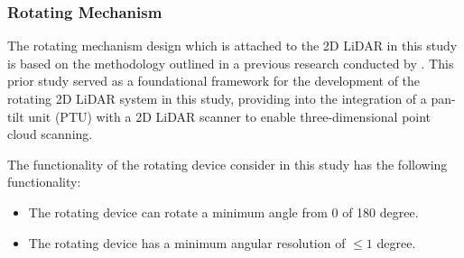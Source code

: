 

\subsubsection{Rotating Mechanism}

The rotating mechanism design which is attached to the 2D LiDAR in this study is based on the methodology outlined in a previous research conducted by \citet{clar2022}. This prior study served as a foundational framework for the development of the rotating 2D LiDAR system in this study, providing into the integration of a pan-tilt unit (PTU) with a 2D LiDAR scanner to enable three-dimensional point cloud scanning.

The functionality of the rotating device consider in this study has the following functionality:

\begin{itemize}
	\item The rotating device can rotate a minimum angle from 0 of 180 degree.
	\item The rotating device has a minimum angular resolution of $\le1$ degree.
\end{itemize}


